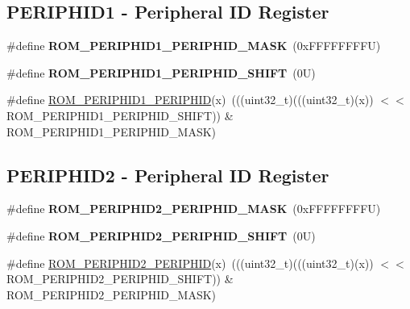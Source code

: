 \subsection*{P\+E\+R\+I\+P\+H\+I\+D1 -\/ Peripheral ID Register}
\begin{DoxyCompactItemize}
\item 
\mbox{\label{group___m_t_b___register___masks_ga89bae76549b2b639d154bbab60fa87a6}} 
\#define {\bfseries R\+O\+M\+\_\+\+P\+E\+R\+I\+P\+H\+I\+D1\+\_\+\+P\+E\+R\+I\+P\+H\+I\+D\+\_\+\+M\+A\+SK}~(0x\+F\+F\+F\+F\+F\+F\+F\+F\+U)
\item 
\mbox{\label{group___m_t_b___register___masks_ga9370b3491eef6cf277f1b64339d4cacf}} 
\#define {\bfseries R\+O\+M\+\_\+\+P\+E\+R\+I\+P\+H\+I\+D1\+\_\+\+P\+E\+R\+I\+P\+H\+I\+D\+\_\+\+S\+H\+I\+FT}~(0\+U)
\item 
\#define \mbox{\hyperlink{group___m_t_b___register___masks_ga67e3b02a049c4ac0c8f3d065175e655e}{R\+O\+M\+\_\+\+P\+E\+R\+I\+P\+H\+I\+D1\+\_\+\+P\+E\+R\+I\+P\+H\+ID}}(x)~(((uint32\+\_\+t)(((uint32\+\_\+t)(x)) $<$$<$ R\+O\+M\+\_\+\+P\+E\+R\+I\+P\+H\+I\+D1\+\_\+\+P\+E\+R\+I\+P\+H\+I\+D\+\_\+\+S\+H\+I\+FT)) \& R\+O\+M\+\_\+\+P\+E\+R\+I\+P\+H\+I\+D1\+\_\+\+P\+E\+R\+I\+P\+H\+I\+D\+\_\+\+M\+A\+SK)
\end{DoxyCompactItemize}
\subsection*{P\+E\+R\+I\+P\+H\+I\+D2 -\/ Peripheral ID Register}
\begin{DoxyCompactItemize}
\item 
\mbox{\label{group___m_t_b___register___masks_gac4fd9dca16b12b524b3f7be8cb5d0386}} 
\#define {\bfseries R\+O\+M\+\_\+\+P\+E\+R\+I\+P\+H\+I\+D2\+\_\+\+P\+E\+R\+I\+P\+H\+I\+D\+\_\+\+M\+A\+SK}~(0x\+F\+F\+F\+F\+F\+F\+F\+F\+U)
\item 
\mbox{\label{group___m_t_b___register___masks_ga3a0032b94f8d01378b20d260317d85d9}} 
\#define {\bfseries R\+O\+M\+\_\+\+P\+E\+R\+I\+P\+H\+I\+D2\+\_\+\+P\+E\+R\+I\+P\+H\+I\+D\+\_\+\+S\+H\+I\+FT}~(0\+U)
\item 
\#define \mbox{\hyperlink{group___m_t_b___register___masks_gac890c8c525b06c4792a9bc16569978e1}{R\+O\+M\+\_\+\+P\+E\+R\+I\+P\+H\+I\+D2\+\_\+\+P\+E\+R\+I\+P\+H\+ID}}(x)~(((uint32\+\_\+t)(((uint32\+\_\+t)(x)) $<$$<$ R\+O\+M\+\_\+\+P\+E\+R\+I\+P\+H\+I\+D2\+\_\+\+P\+E\+R\+I\+P\+H\+I\+D\+\_\+\+S\+H\+I\+FT)) \& R\+O\+M\+\_\+\+P\+E\+R\+I\+P\+H\+I\+D2\+\_\+\+P\+E\+R\+I\+P\+H\+I\+D\+\_\+\+M\+A\+SK)
\end{DoxyCompactItemize}
